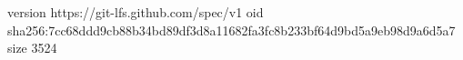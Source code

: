 version https://git-lfs.github.com/spec/v1
oid sha256:7cc68ddd9cb88b34bd89df3d8a11682fa3fc8b233bf64d9bd5a9eb98d9a6d5a7
size 3524
